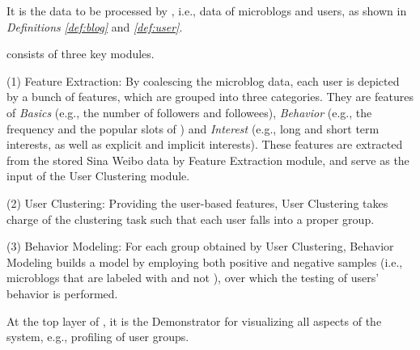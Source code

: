  It is the data to be processed by \sys{}, i.e., data of microblogs and users, as shown in \textit{Definitions} \textit{\ref{def:blog}} and \textit{\ref{def:user}}.

\sys{} consists of three key modules.

	\stab(1)  Feature Extraction: By coalescing the microblog data, each user is depicted by a bunch of features, which are grouped into three categories. They are features of \textit{Basics} (e.g., the number of followers and followees), \textit{Behavior} (e.g., the frequency and the popular slots of \retg{}) and \textit{Interest} (e.g., long and short term interests, as well as explicit and implicit interests). These features are extracted from the stored  Sina Weibo data by Feature Extraction module, and serve as the input of the User Clustering module.
	
	\stab(2)  User Clustering: Providing the user-based features, User Clustering takes charge of the clustering task such that each user falls into a proper group.
	
	\stab(3)  Behavior Modeling: For each group obtained by User Clustering, Behavior Modeling builds a  model by employing both positive and negative samples (i.e., microblogs that are labeled with \retd{} and not \retd{}), over which the testing of users' \retg{} behavior is performed.
	
 At the top layer of \sys{}, it is the Demonstrator for visualizing all aspects of the system, e.g., profiling of user groups.


